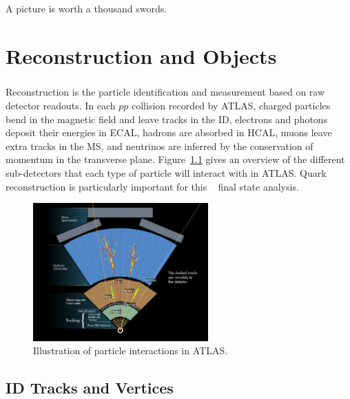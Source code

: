 \begin{savequote}[75mm]
A picture is worth a thousand swords.
\end{savequote}

\chapter{Reconstruction and Objects}

\paragraph{}
Reconstruction is the particle identification and measurement based on raw detector readouts. 
In each $pp$ collision recorded by ATLAS, charged particles bend in the magnetic field and leave tracks in the ID, electrons and photons deposit their energies in ECAL, hadrons are absorbed in HCAL, muons leave extra tracks in the MS, and neutrinos are inferred by the conservation of momentum in the transverse plane. 
Figure~\ref{fig:obj_reco_overview} gives an overview of the different sub-detectors that each type of particle will interact with in ATLAS. 
Quark reconstruction is particularly important for this \bbbb~ final state analysis.

\begin{figure}[htbp!]
  \centering
  \captionsetup{justification=centering}
  \includegraphics[width=0.6\textwidth]{figures/detector/ATLAS_particle}
   \caption{Illustration of particle interactions in ATLAS.}
  \label{fig:obj_reco_overview}
\end{figure}

\section{ID Tracks and Vertices}


